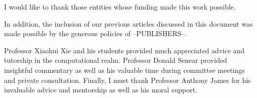 \acknowledgments
{
% 

I would like to thank those entities whose funding made this work possible.

In addition, the inclusion of our previous articles discussed in this document was made possible by the generous policies of --PUBLISHERS--.

Professor Xiaohui Xie and his students provided much appreciated advice and tutorship in the computational realm.
Professor Donald Senear provided insightful commentary as well as his valuable time during committee meetings and private consultation.
Finally, I must thank Professor Anthony James for his invaluable advice and mentorship as well as his moral support.

%   
%   
%   
}



